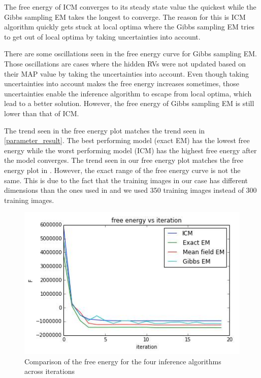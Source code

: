 \documentclass{article} %
\begin{document}
The free energy of ICM converges to its steady state value the quickest while the Gibbs sampling EM takes the longest to converge. The reason for this is ICM algorithm quickly gets stuck at local optima where the Gibbs sampling EM tries to get out of local optima by taking uncertainties into account.

There are some oscillations seen in the free energy curve for Gibbs sampling EM. Those oscillations are cases where the hidden RVs were not updated based on their MAP value by taking the uncertainties into account. Even though taking uncertainties into account makes the free energy increases sometimes, those uncertainties enable the inference algorithm to escape from local optima, which lead to a better solution. However, the free energy of Gibbs sampling EM is still lower than that of ICM. 

The trend seen in the free energy plot matches the trend seen in \ref{parameter_result}. The best performing model (exact EM) has the lowest free energy while the worst performing model (ICM) has the highest free energy after the model converges. The trend seen in our free energy plot matches the free energy plot in \cite{b2}. However, the exact range of the free energy curve is not the same. This is due to the fact that the training images in our case has different dimensions than the ones used in \cite{b2} and we used 350 training images instead of 300 training images. 
\begin{figure}[h]
\begin{center}
\includegraphics[width=1\textwidth]{free_energy}
\end{center}
\caption{Comparison of the free energy for the four inference algorithms across iterations}
\label{fig:free_energy}
\end{figure}
\end{document}
